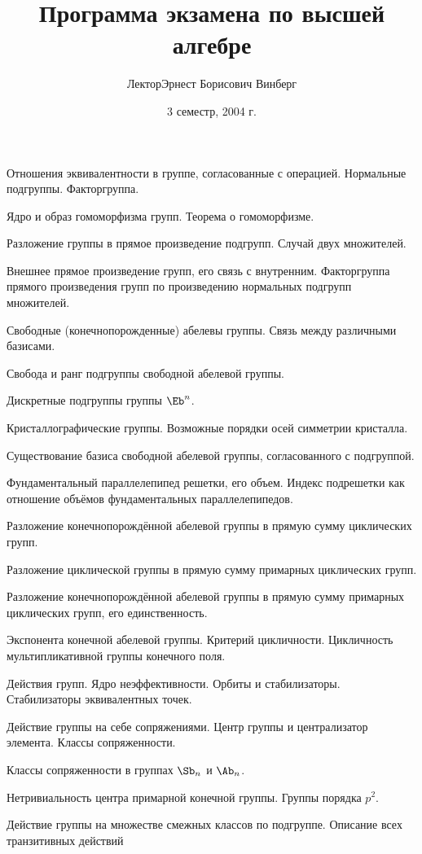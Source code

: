 \documentclass[a4paper]{article}
\title{Программа экзамена по высшей алгебре}
\author{Лектор\т Эрнест Борисович Винберг}
\date{3 семестр, 2004 г.}
\begin{document}
\maketitle
\begin{nums}{-1}
\item Отношения эквивалентности в группе, согласованные с операцией. Нормальные подгруппы. Факторгруппа.
\item Ядро и образ гомоморфизма групп. Теорема о гомоморфизме.
\item Разложение группы в прямое произведение подгрупп. Случай двух множителей.
\item Внешнее прямое произведение групп, его связь с внутренним. Факторгруппа прямого
      произведения групп по произведению нормальных подгрупп множителей.
\item Свободные (конечнопорожденные) абелевы группы. Связь между различными базисами.
\item Свобода и ранг подгруппы свободной абелевой группы.
\item Дискретные подгруппы группы $\Eb^n$.
\item Кристаллографические группы. Возможные порядки осей симметрии кристалла.
\item Существование базиса свободной абелевой группы, согласованного с подгруппой.
\item Фундаментальный параллелепипед решетки, его объем. Индекс подрешетки как отношение
      объёмов фундаментальных параллелепипедов.
\item Разложение конечнопорождённой абелевой группы в прямую сумму циклических групп.
\item Разложение циклической группы в прямую сумму примарных циклических групп.
\item Разложение конечнопорождённой абелевой группы в прямую сумму примарных циклических групп, его единственность.
\item Экспонента конечной абелевой группы. Критерий цикличности. Цикличность мультипликативной группы конечного поля.
\item Действия групп. Ядро неэффективности. Орбиты и стабилизаторы. Стабилизаторы эквивалентных точек.
\item Действие группы на себе сопряжениями. Центр группы и централизатор элемента. Классы сопряженности.
\item Классы сопряженности в группах $\Sb_n$ и $\Ab_n$.
\item Нетривиальность центра примарной конечной группы. Группы порядка $p^2$.
\item Действие группы на множестве смежных классов по подгруппе. Описание всех транзитивных действий

\end{nums}
\end{document}

